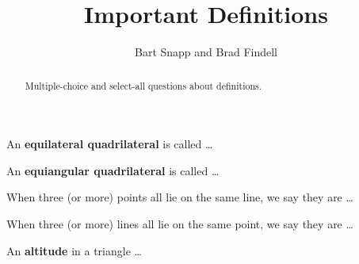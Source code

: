 \documentclass[nooutcomes]{ximera}
\title{Important Definitions}
\author{Bart Snapp and Brad Findell}
\begin{document}
\begin{abstract}
Multiple-choice and select-all questions about definitions. 
\end{abstract}
\maketitle

%

\begin{question}  
An \textbf{equilateral quadrilateral} is called \dots
\begin{multipleChoice}  
\end{multipleChoice}  
\end{question}

\begin{question}  
An \textbf{equiangular quadrilateral} is called \dots
\begin{multipleChoice}  
\end{multipleChoice}  
\end{question}

\begin{question}  
When three (or more) points all lie on the same line, we say they are \dots
\begin{multipleChoice}  
\end{multipleChoice}  
\end{question}

\begin{question}  
When three (or more) lines all lie on the same point, we say they are \dots
\begin{multipleChoice}  
\end{multipleChoice}  
\end{question}

\begin{question}  
An \textbf{altitude} in a triangle \dots
\begin{multipleChoice}  
\end{multipleChoice}  
\end{question}
\end{document}
